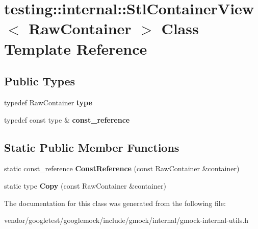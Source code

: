 \hypertarget{classtesting_1_1internal_1_1StlContainerView}{}\section{testing\+:\+:internal\+:\+:Stl\+Container\+View$<$ Raw\+Container $>$ Class Template Reference}
\label{classtesting_1_1internal_1_1StlContainerView}
\subsection*{Public Types}
\begin{DoxyCompactItemize}
\item 
typedef Raw\+Container {\bfseries type}\hypertarget{classtesting_1_1internal_1_1StlContainerView_a2b2c63a6dcdbfe63fb0ee121ebf463ba}{}\label{classtesting_1_1internal_1_1StlContainerView_a2b2c63a6dcdbfe63fb0ee121ebf463ba}

\item 
typedef const type \& {\bfseries const\+\_\+reference}\hypertarget{classtesting_1_1internal_1_1StlContainerView_a9cd4f6ed689b3938cdb7b3c4cbf1b36b}{}\label{classtesting_1_1internal_1_1StlContainerView_a9cd4f6ed689b3938cdb7b3c4cbf1b36b}

\end{DoxyCompactItemize}
\subsection*{Static Public Member Functions}
\begin{DoxyCompactItemize}
\item 
static const\+\_\+reference {\bfseries Const\+Reference} (const Raw\+Container \&container)\hypertarget{classtesting_1_1internal_1_1StlContainerView_a36eccf53329730f6e55c12002128bf25}{}\label{classtesting_1_1internal_1_1StlContainerView_a36eccf53329730f6e55c12002128bf25}

\item 
static type {\bfseries Copy} (const Raw\+Container \&container)\hypertarget{classtesting_1_1internal_1_1StlContainerView_a441123838221f1284873f66ed968f279}{}\label{classtesting_1_1internal_1_1StlContainerView_a441123838221f1284873f66ed968f279}

\end{DoxyCompactItemize}


The documentation for this class was generated from the following file\+:\begin{DoxyCompactItemize}
\item 
vendor/googletest/googlemock/include/gmock/internal/gmock-\/internal-\/utils.\+h\end{DoxyCompactItemize}
